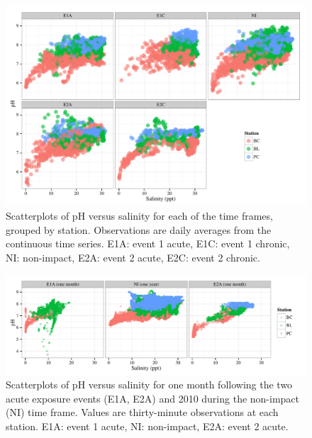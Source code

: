 \documentclass[letterpaper,12pt]{article}\usepackage[]{graphicx}\usepackage[]{color}
\makeatletter
\def\maxwidth{ %
  \ifdim\Gin@nat@width>\linewidth
    \linewidth
  \else
    \Gin@nat@width
  \fi
}
\makeatother
\begin{document}
\clearpage

\begin{figure}[!ht]

{\centering \includegraphics[width=\maxwidth]{figs/phvsal1-1} 

}

\caption[Scatterplots of pH versus salinity for each of the time frames, grouped by station]{Scatterplots of pH versus salinity for each of the time frames, grouped by station.  Observations are daily averages from the continuous time series. E1A: event 1 acute, E1C: event 1 chronic, NI: non-impact, E2A: event 2 acute, E2C: event 2 chronic.}\label{fig:phvsal1}
\end{figure}


\clearpage

\begin{figure}[!ht]

{\centering \includegraphics[width=\maxwidth]{figs/phvsal2-1} 

}

\caption[Scatterplots of pH versus salinity for one month following the two acute exposure events (E1A, E2A) and 2010 during the non-impact (NI) time frame]{Scatterplots of pH versus salinity for one month following the two acute exposure events (E1A, E2A) and 2010 during the non-impact (NI) time frame.  Values are thirty-minute observations at each station. E1A: event 1 acute, NI: non-impact, E2A: event 2 acute.}\label{fig:phvsal2}
\end{figure}
\end{document}
